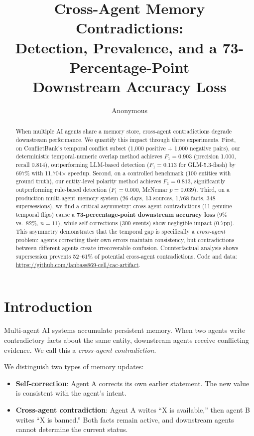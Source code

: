 \documentclass{article}
\title{Cross-Agent Memory Contradictions:\\Detection, Prevalence, and a 73-Percentage-Point\\Downstream Accuracy Loss}
\author{Anonymous}
\date{}
\begin{document}
\maketitle

\begin{abstract}
When multiple AI agents share a memory store, cross-agent contradictions degrade downstream performance. We quantify this impact through three experiments. First, on ConflictBank's temporal conflict subset (1{,}000 positive + 1{,}000 negative pairs), our deterministic temporal-numeric overlap method achieves $F_1 = 0.903$ (precision 1.000, recall 0.814), outperforming LLM-based detection ($F_1 = 0.113$ for GLM-5.3-flash) by 697\% with 11{,}704$\times$ speedup. Second, on a controlled benchmark (100 entities with ground truth), our entity-level polarity method achieves $F_1 = 0.813$, significantly outperforming rule-based detection ($F_1 = 0.000$, McNemar $p = 0.039$). Third, on a production multi-agent memory system (26 days, 13 sources, 1{,}768 facts, 348 supersessions), we find a critical asymmetry: cross-agent contradictions (11 genuine temporal flips) cause a \textbf{73-percentage-point downstream accuracy loss} (9\% vs.\ 82\%, $n{=}11$), while self-corrections (300 events) show negligible impact (0.7pp). This asymmetry demonstrates that the temporal gap is specifically a \emph{cross-agent} problem: agents correcting their own errors maintain consistency, but contradictions between different agents create irrecoverable confusion. Counterfactual analysis shows supersession prevents 52--61\% of potential cross-agent contradictions. Code and data: \url{https://github.com/lanbass869-cell/cac-artifact}.
\end{abstract}

\section{Introduction}

Multi-agent AI systems accumulate persistent memory. When two agents write contradictory facts about the same entity, downstream agents receive conflicting evidence. We call this a \emph{cross-agent contradiction}.

We distinguish two types of memory updates:
\begin{itemize}
\item \textbf{Self-correction}: Agent A corrects its own earlier statement. The new value is consistent with the agent's intent.
\item \textbf{Cross-agent contradiction}: Agent A writes ``X is available,'' then agent B writes ``X is banned.'' Both facts remain active, and downstream agents cannot determine the current status.
\end{itemize}
\end{document}
